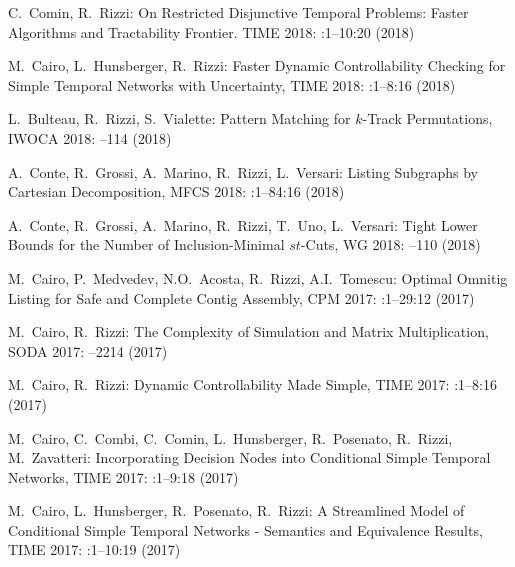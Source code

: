 \begin{etaremune}
  \item {\sc C.~Comin, R.~Rizzi:}
   \newblock On Restricted Disjunctive Temporal Problems: Faster Algorithms and Tractability Frontier.
   \newblock TIME 2018:
   :1--10:20 (2018)
  
  \item {\sc M.~Cairo, L.~Hunsberger, R.~Rizzi:}
   \newblock Faster Dynamic Controllability Checking for Simple Temporal Networks with Uncertainty,
   \newblock TIME 2018:
   :1--8:16 (2018)
   
  \item {\sc L.~Bulteau, R.~Rizzi, S.~Vialette:}
   \newblock Pattern Matching for $k$-Track Permutations,
   \newblock IWOCA 2018:
   --114 (2018)

  \item {\sc A.~Conte, R.~Grossi, A.~Marino, R.~Rizzi, L.~Versari:}
   \newblock Listing Subgraphs by Cartesian Decomposition,
   \newblock MFCS 2018:
   :1--84:16 (2018)

  \item {\sc A.~Conte, R.~Grossi, A.~Marino, R.~Rizzi, T.~Uno, L.~Versari:}
   \newblock Tight Lower Bounds for the Number of Inclusion-Minimal $st$-Cuts,
   \newblock WG 2018:
   --110 (2018)
   
  \item {\sc M.~Cairo, P.~Medvedev, N.O.~Acosta, R.~Rizzi, A.I.~Tomescu:}
   \newblock Optimal Omnitig Listing for Safe and Complete Contig Assembly,
   \newblock CPM 2017:
   :1--29:12 (2017)

  \item {\sc M.~Cairo, R.~Rizzi:}
   \newblock The Complexity of Simulation and Matrix Multiplication,
   \newblock SODA 2017:
   --2214 (2017)

  \item {\sc M.~Cairo, R.~Rizzi:}
   \newblock Dynamic Controllability Made Simple,
   \newblock TIME 2017:
   :1--8:16 (2017)

  \item {\sc M.~Cairo, C.~Combi, C.~Comin, L.~Hunsberger, R.~Posenato, R.~Rizzi, M.~Zavatteri:}
   \newblock Incorporating Decision Nodes into Conditional Simple Temporal Networks,
   \newblock TIME 2017:
   :1--9:18 (2017)

  \item {\sc M.~Cairo, L.~Hunsberger, R.~Posenato, R.~Rizzi:}
   \newblock A Streamlined Model of Conditional Simple Temporal Networks - Semantics and Equivalence Results,
   \newblock TIME 2017:
   :1--10:19 (2017)


\end{etaremune}
